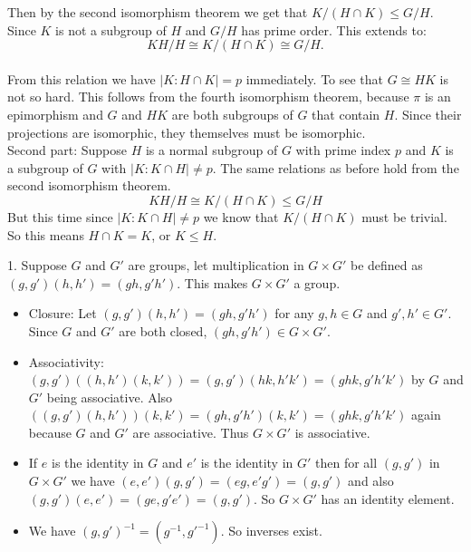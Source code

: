 \documentclass[12pt]{report}
\begin{document}
Then by the second isomorphism theorem we get that $K/(H \cap K) \leq G/H$.
Since $K$ is not a subgroup of $H$ and $G/H$ has prime order. This extends to:
$$KH/H \cong K/(H\cap K) \cong G/H.$$\\

From this relation we have $|K : H \cap K| = p$ immediately. To see that $G
\cong HK$ is not so hard. This follows from the fourth isomorphism theorem,
because $\pi$ is an epimorphism and $G$ and $HK$ are both subgroups of $G$ that
contain $H$. Since their projections are isomorphic, they themselves must be
isomorphic.\\

Second part: Suppose $H$ is a normal subgroup of $G$ with prime index $p$ and
$K$ is a subgroup of $G$ with $|K: K\cap H| \neq p$. The same relations as
before hold from the second isomorphism theorem.\\

$$KH/H \cong K/(H \cap K) \leq G/H $$
But this time since $|K : K\cap H| \neq p$ we know that $K/(H \cap K)$ must be
trivial. So this means $H \cap K = K$, or $K \leq H$.\\


1. Suppose $G$ and $G'$ are groups, let multiplication in $G \times G'$ be
defined as $(g,g')(h,h') = (gh,g'h')$. This makes $G \times G'$ a group.

\begin{itemize}
  \item Closure: Let $(g,g')(h,h') = (gh,g'h')$ for any $g,h \in G$ and $g',h'
        \in G'$. Since $G$ and $G'$ are both closed, $(gh,g'h') \in G\times G'$.

  \item Associativity: $(g,g')((h,h')(k,k')) = (g,g')(hk,h'k') = (ghk,g'h'k')$
        by $G$ and $G'$ being associative. Also $((g,g')(h,h'))(k,k') =
        (gh,g'h')(k,k') = (ghk,g'h'k')$ again because $G$ and $G'$ are
        associative. Thus $G \times G'$ is associative.

  \item If $e$ is the identity in $G$ and $e'$ is the identity in $G'$ then
        for all $(g,g')$ in $G \times G'$ we have $(e,e')(g,g') = (eg,e'g') =
        (g,g')$ and also $(g,g')(e,e') = (ge,g'e') =
        (g,g')$. So $G \times G'$ has an identity element.

  \item We have $(g,g')^{-1} = (g^{-1},g'^{-1})$. So inverses exist.
  \end{itemize}
\end{document}
